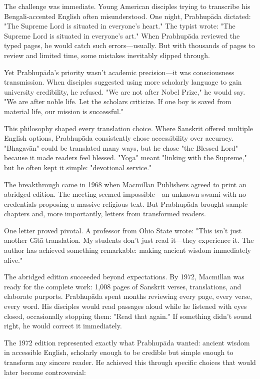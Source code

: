 \documentclass[11pt,twoside]{book}
\begin{document}
The challenge was immediate. Young American disciples trying to transcribe his Bengali-accented English often misunderstood. One night, Prabhupāda dictated: "The Supreme Lord is situated in everyone's heart." The typist wrote: "The Supreme Lord is situated in everyone's art." When Prabhupāda reviewed the typed pages, he would catch such errors—usually. But with thousands of pages to review and limited time, some mistakes inevitably slipped through.

Yet Prabhupāda's priority wasn't academic precision—it was consciousness transmission. When disciples suggested using more scholarly language to gain university credibility, he refused. "We are not after Nobel Prize," he would say. "We are after noble life. Let the scholars criticize. If one boy is saved from material life, our mission is successful."

This philosophy shaped every translation choice. Where Sanskrit offered multiple English options, Prabhupāda consistently chose accessibility over accuracy. "Bhagavān" could be translated many ways, but he chose "the Blessed Lord" because it made readers feel blessed. "Yoga" meant "linking with the Supreme," but he often kept it simple: "devotional service."

The breakthrough came in 1968 when Macmillan Publishers agreed to print an abridged edition. The meeting seemed impossible—an unknown swami with no credentials proposing a massive religious text. But Prabhupāda brought sample chapters and, more importantly, letters from transformed readers.

One letter proved pivotal. A professor from Ohio State wrote: "This isn't just another Gītā translation. My students don't just read it—they experience it. The author has achieved something remarkable: making ancient wisdom immediately alive."

The abridged edition succeeded beyond expectations. By 1972, Macmillan was ready for the complete work: 1,008 pages of Sanskrit verses, translations, and elaborate purports. Prabhupāda spent months reviewing every page, every verse, every word. His disciples would read passages aloud while he listened with eyes closed, occasionally stopping them: "Read that again." If something didn't sound right, he would correct it immediately.

The 1972 edition represented exactly what Prabhupāda wanted: ancient wisdom in accessible English, scholarly enough to be credible but simple enough to transform any sincere reader. He achieved this through specific choices that would later become controversial:
\end{document}
